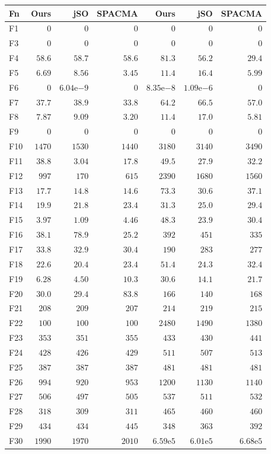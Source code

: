 \begin{tabular}{lrrrrrr}
\toprule
Fn & Ours & jSO & SPACMA & Ours & jSO & SPACMA \\
\midrule
F1 & $0$ & $0$ & $0$ & $0$ & $0$ & $0$ \\
F3 & $0$ & $0$ & $0$ & $0$ & $0$ & $0$ \\
F4 & $58.6$ & $58.7$ & $58.6$ & $81.3$ & $56.2$ & $29.4$ \\
F5 & $6.69$ & $8.56$ & $3.45$ & $11.4$ & $16.4$ & $5.99$ \\
F6 & $0$ & $6.04\mathrm{e}{-9}$ & $0$ & $8.35\mathrm{e}{-8}$ & $1.09\mathrm{e}{-6}$ & $0$ \\
F7 & $37.7$ & $38.9$ & $33.8$ & $64.2$ & $66.5$ & $57.0$ \\
F8 & $7.87$ & $9.09$ & $3.20$ & $11.4$ & $17.0$ & $5.81$ \\
F9 & $0$ & $0$ & $0$ & $0$ & $0$ & $0$ \\
F10 & $1470$ & $1530$ & $1440$ & $3180$ & $3140$ & $3490$ \\
F11 & $38.8$ & $3.04$ & $17.8$ & $49.5$ & $27.9$ & $32.2$ \\
F12 & $997$ & $170$ & $615$ & $2390$ & $1680$ & $1560$ \\
F13 & $17.7$ & $14.8$ & $14.6$ & $73.3$ & $30.6$ & $37.1$ \\
F14 & $19.9$ & $21.8$ & $23.4$ & $31.3$ & $25.0$ & $29.4$ \\
F15 & $3.97$ & $1.09$ & $4.46$ & $48.3$ & $23.9$ & $30.4$ \\
F16 & $38.1$ & $78.9$ & $25.2$ & $392$ & $451$ & $335$ \\
F17 & $33.8$ & $32.9$ & $30.4$ & $190$ & $283$ & $277$ \\
F18 & $22.6$ & $20.4$ & $23.4$ & $51.4$ & $24.3$ & $32.4$ \\
F19 & $6.28$ & $4.50$ & $10.3$ & $30.6$ & $14.1$ & $21.7$ \\
F20 & $30.0$ & $29.4$ & $83.8$ & $166$ & $140$ & $168$ \\
F21 & $208$ & $209$ & $207$ & $214$ & $219$ & $215$ \\
F22 & $100$ & $100$ & $100$ & $2480$ & $1490$ & $1380$ \\
F23 & $353$ & $351$ & $355$ & $433$ & $430$ & $441$ \\
F24 & $428$ & $426$ & $429$ & $511$ & $507$ & $513$ \\
F25 & $387$ & $387$ & $387$ & $481$ & $481$ & $481$ \\
F26 & $994$ & $920$ & $953$ & $1200$ & $1130$ & $1140$ \\
F27 & $506$ & $497$ & $505$ & $537$ & $511$ & $532$ \\
F28 & $318$ & $309$ & $311$ & $465$ & $460$ & $460$ \\
F29 & $434$ & $434$ & $445$ & $348$ & $363$ & $392$ \\
F30 & $1990$ & $1970$ & $2010$ & $6.59\mathrm{e}{5}$ & $6.01\mathrm{e}{5}$ & $6.68\mathrm{e}{5}$ \\
\bottomrule
\end{tabular}
